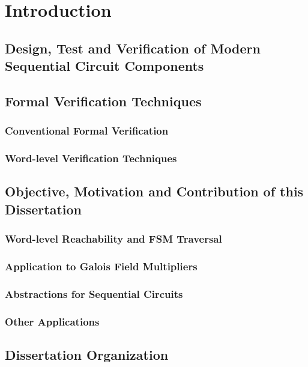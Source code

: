 \chapter{Introduction}
\label{ch:intro}
\section{Design, Test and Verification of Modern Sequential Circuit Components}

\section{Formal Verification Techniques}
\subsection{Conventional Formal Verification}
\subsection{Word-level Verification Techniques}

\section{Objective, Motivation and Contribution of this Dissertation}
\subsection{Word-level Reachability and FSM Traversal}
\subsection{Application to Galois Field Multipliers}
\subsection{Abstractions for Sequential Circuits}
\subsection{Other Applications}

\section{Dissertation Organization}